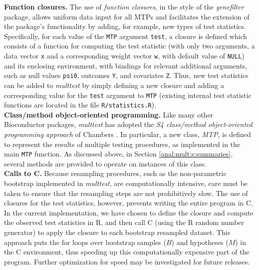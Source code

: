 \documentclass[11pt]{article}
\newcommand{\Rpackage}[1]{\textit{#1}}
\newcommand{\Robject}[1]{\texttt{#1}}
\newcommand{\Rclass}[1]{\textit{#1}}
\begin{document}
\noindent
{\bf Function closures.}  The use of {\em function closures}, in the style of the \Rpackage{genefilter} package, allows uniform data input for all MTPs and facilitates the extension of the package's functionality by adding, for example, new types of test statistics. 
Specifically, for each value of the \Robject{MTP} argument \Robject{test}, a closure is defined which consists of a function for computing the test statistic (with only two arguments, a data vector \Robject{x} and a corresponding weight vector \Robject{w}, with default value of \Robject{NULL}) and its enclosing environment, with bindings for relevant additional arguments, such as null values \Robject{psi0}, outcomes \Robject{Y}, and covariates \Robject{Z}. 
Thus, new test statistics can be added to \Rpackage{multtest} by simply defining a new closure and adding a corresponding value for the \Robject{test} argument to \Robject{MTP} (existing internal test statistic functions are located in the file \texttt{R/statistics.R}).\\

\noindent
{\bf Class/method object-oriented programming.}  Like many other Bioconductor packages, \Rpackage{multtest}  has adopted the {\em S4 class/method object-oriented programming approach} of Chambers \cite{Chambers98}.
In particular, a new class, \Rclass{MTP}, is defined to represent the results of multiple testing procedures, as implemented in the main \Robject{MTP} function. As discussed above, in Section \ref{anal:mult:s:summaries}, several methods are provided to operate on instances of this class.\\

\noindent
{\bf Calls to C.} Because resampling procedures, such as the non-parametric bootstrap implemented in \Rpackage{multtest}, are computationally intensive, care must be taken to ensure that the resampling steps are not prohibitively slow. The use of closures for the test statistics, however, prevents writing the entire program in C. In the current implementation, we have chosen to define the closure and compute the observed test statistics in R, and then call C (using the R random number generator) to apply the closure to each bootstrap resampled dataset. This approach puts the for loops over bootstrap samples ($B$) and hypotheses ($M$) in the C environment, thus speeding up this computationally expensive part of the program. Further optimization for speed may be investigated for future releases. 

\end{document}
